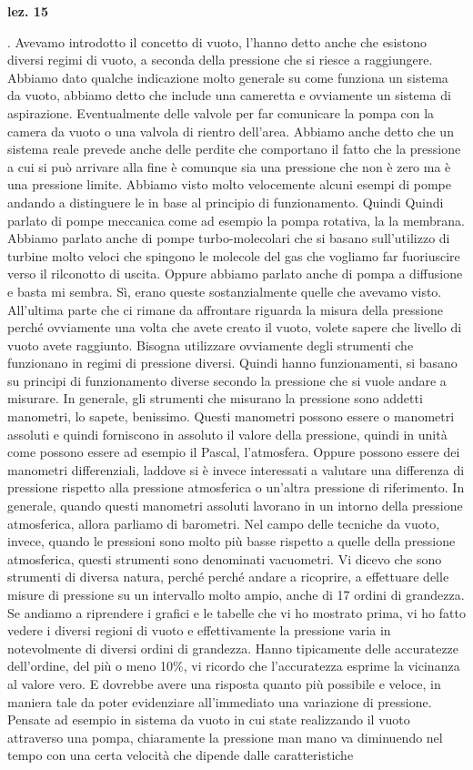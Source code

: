 \textbf{lez. 15}

. Avevamo introdotto il concetto di vuoto, l'hanno detto anche che esistono diversi regimi di vuoto, a seconda della pressione che si riesce a raggiungere. Abbiamo dato qualche indicazione molto generale su come funziona un sistema da vuoto, abbiamo detto che include una cameretta e ovviamente un sistema di aspirazione. Eventualmente delle valvole per far comunicare la pompa con la camera da vuoto o una valvola di rientro dell'area. Abbiamo anche detto che un sistema reale prevede anche delle perdite che comportano il fatto che la pressione a cui si può arrivare alla fine è comunque sia una pressione che non è zero ma è una pressione limite. Abbiamo visto molto velocemente alcuni esempi di pompe andando a distinguere le in base al principio di funzionamento. Quindi Quindi parlato di pompe meccanica come ad esempio la pompa rotativa, la la membrana. Abbiamo parlato anche di pompe turbo-molecolari che si basano sull'utilizzo di turbine molto veloci che spingono le molecole del gas che vogliamo far fuoriuscire verso il rilconotto di uscita. Oppure abbiamo parlato anche di pompa a diffusione e basta mi sembra. Sì, erano queste sostanzialmente quelle che avevamo visto. All'ultima parte che ci rimane da affrontare riguarda la misura della pressione perché ovviamente una volta che avete creato il vuoto, volete sapere che livello di vuoto avete raggiunto. Bisogna utilizzare ovviamente degli strumenti che funzionano in regimi di pressione diversi. Quindi hanno funzionamenti, si basano su principi di funzionamento diverse secondo la pressione che si vuole andare a misurare. In generale, gli strumenti che misurano la pressione sono addetti manometri, lo sapete, benissimo. Questi manometri possono essere o manometri assoluti e quindi forniscono in assoluto il valore della pressione, quindi in unità come possono essere ad esempio il Pascal, l'atmosfera. Oppure possono essere dei manometri differenziali, laddove si è invece interessati a valutare una differenza di pressione rispetto alla pressione atmosferica o un'altra pressione di riferimento. In generale, quando questi manometri assoluti lavorano in un intorno della pressione atmosferica, allora parliamo di barometri. Nel campo delle tecniche da vuoto, invece, quando le pressioni sono molto più basse rispetto a quelle della pressione atmosferica, questi strumenti sono denominati vacuometri. Vi dicevo che sono strumenti di diversa natura, perché perché andare a ricoprire, a effettuare delle misure di pressione su un intervallo molto ampio, anche di 17 ordini di grandezza. Se andiamo a riprendere i grafici e le tabelle che vi ho mostrato prima, vi ho fatto vedere i diversi regioni di vuoto e effettivamente la pressione varia in notevolmente di diversi ordini di grandezza. Hanno tipicamente delle accuratezze dell'ordine, del più o meno 10\%, vi ricordo che l'accuratezza esprime la vicinanza al valore vero. E dovrebbe avere una risposta quanto più possibile e veloce, in maniera tale da poter evidenziare all'immediato una variazione di pressione. Pensate ad esempio in sistema da vuoto in cui state realizzando il vuoto attraverso una pompa, chiaramente la pressione man mano va diminuendo nel tempo con una certa velocità che dipende dalle caratteristiche 